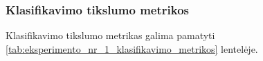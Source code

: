\subsubsection{Klasifikavimo tikslumo metrikos}
\label{subsubsec:eksperimentas_nr_1_klasifikacijos_tikslumo_metrikos}

Klasifikavimo tikslumo metrikas galima pamatyti \ref{tab:eksperimento_nr_1_klasifikavimo_metrikos} lentelėje.

